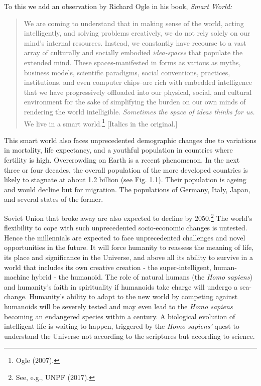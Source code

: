 \begin{multicols}{2}
To this we add an observation by Richard Ogle in his book, \textit{Smart World:}

\medskip

\begin{quote}
We are coming to understand that in making sense of the world, acting intelligently, and solving problems creatively, we do not rely solely on our mind's internal resources. Instead, we constantly have recourse to a vast array of culturally and socially embodied \textit{idea-spaces} that populate the extended mind. These spaces-manifested in forms as various as myths, business models, scientific paradigms, social conventions, practices, institutions, and even computer chips--are rich with embedded intelligence that we have progressively offloaded into our physical, social, and cultural environment for the sake of simplifying the burden on our own minds of rendering the world intelligible. \textit{Sometimes the space of ideas thinks for us.} We live in a smart world.\footnote{Ogle (2007).} [Italics in the original.] 
\end{quote}

This smart world also faces unprecedented demographic changes due to variations in mortality, life expectancy, and a youthful population in countries where fertility is high. Overcrowding on Earth is a recent phenomenon. In the next three or four decades, the overall population of the more developed countries is likely to stagnate at about 1.2 billion (see Fig. 1.1). Their population is ageing and would decline but for migration. The populations of Germany, Italy, Japan, and several states of the former. 

Soviet Union that broke away are also expected to decline by 2050.\footnote{See, e.g., UNPF (2017).} The world's flexibility to cope with such unprecedented socio-economic changes is untested. Hence the millennials are expected to face unprecedented challenges and novel opportunities in the future. It will force humanity to reassess the meaning of life, its place and significance in the Universe, and above all its ability to survive in a world that includes its own creative creation - the super-intelligent, human-machine hybrid - the humanoid. The role of natural humans (the \textit{Homo sapiens}) and humanity's faith in spirituality if humanoids take charge will undergo a sea-change. Humanity's ability to adapt to the new world by competing against humanoids will be severely tested and may even lead to the \textit{Homo sapiens} becoming an endangered species within a century. A biological evolution of intelligent life is waiting to happen, triggered by the \textit{Homo sapiens'} quest to understand the Universe not according to the scriptures but according to science.


\end{multicols}
